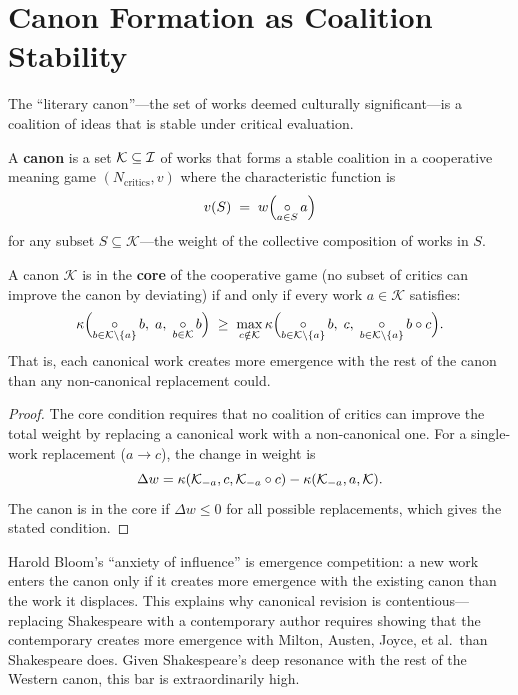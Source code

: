 \section{Canon Formation as Coalition Stability}
\label{sec:canon}

The ``literary canon''---the set of works deemed culturally
significant---is a coalition of ideas that is stable under
critical evaluation.

\begin{definition}
\label{def:canon}
A \textbf{canon} is a set $\mathcal{K} \subseteq \mathcal{I}$ of works
that forms a stable coalition in a cooperative meaning game
$(N_{\mathrm{critics}}, v)$ where the characteristic function is
\[
  v(S) \;=\; w\Bigl(\mathop{\circ}_{a \in S} a\Bigr)
\]
for any subset $S \subseteq \mathcal{K}$---the weight of the
collective composition of works in $S$.
\end{definition}

\begin{theorem}
\label{thm:canon-stability}
A canon $\mathcal{K}$ is in the \textbf{core} of the cooperative
game (no subset of critics can improve the canon by deviating)
if and only if every work $a \in \mathcal{K}$ satisfies:
\[
  \kappa\Bigl(\mathop{\circ}_{b \in \mathcal{K}\setminus\{a\}} b,\;
  a,\; \mathop{\circ}_{b \in \mathcal{K}} b\Bigr)
  \;\ge\; \max_{c \notin \mathcal{K}}
  \kappa\Bigl(\mathop{\circ}_{b \in \mathcal{K}\setminus\{a\}} b,\;
  c,\; \mathop{\circ}_{b \in \mathcal{K}\setminus\{a\}} b \circ c\Bigr).
\]
That is, each canonical work creates more emergence with the rest
of the canon than any non-canonical replacement could.
\end{theorem}

\begin{proof}
The core condition requires that no coalition of critics can
improve the total weight by replacing a canonical work with a
non-canonical one.  For a single-work replacement ($a \to c$),
the change in weight is
\[
  \Delta w = \kappa(\mathcal{K}_{-a}, c, \mathcal{K}_{-a} \circ c)
  - \kappa(\mathcal{K}_{-a}, a, \mathcal{K}).
\]
The canon is in the core if $\Delta w \le 0$ for all possible
replacements, which gives the stated condition.
\end{proof}

\begin{interpretation}
Harold Bloom's ``anxiety of influence'' is emergence competition:
a new work enters the canon only if it creates more emergence with
the existing canon than the work it displaces.  This explains why
canonical revision is contentious---replacing Shakespeare with a
contemporary author requires showing that the contemporary creates
more emergence with Milton, Austen, Joyce, et al.\ than Shakespeare
does.  Given Shakespeare's deep resonance with the rest of the
Western canon, this bar is extraordinarily high.
\end{interpretation}

